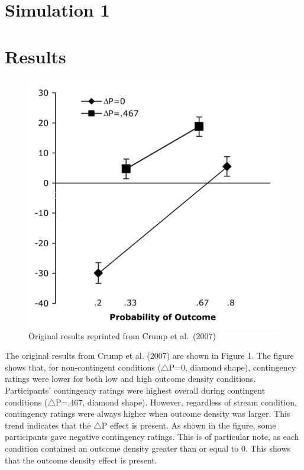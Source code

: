 \documentclass[
  english,
  man,floatsintext]{apa6}
\begin{document}
\hypertarget{simulation-1}{%
\section{Simulation 1}\label{simulation-1}}

\hypertarget{results}{%
\section{Results}\label{results}}

\begin{figure}
\centering
\includegraphics{imgs/crump_results.png}
\caption{\label{fig:unnamed-chunk-2}Original results reprinted from Crump et al.~(2007)}
\end{figure}

The original results from Crump et al. (2007) are shown in Figure 1. The figure shows that, for non-contingent conditions (\(\triangle\)P=0, diamond shape), contingency ratings were lower for both low and high outcome density conditions. Participants' contingency ratings were highest overall during contingent conditions (\(\triangle\)P=.467, diamond shape). However, regardless of stream condition, contingency ratings were always higher when outcome density was larger. This trend indicates that the \(\triangle\)P effect is present. As shown in the figure, some participants gave negative contingency ratings. This is of particular note, as each condition contained an outcome density greater than or equal to 0. This shows that the outcome density effect is present.
\end{document}
